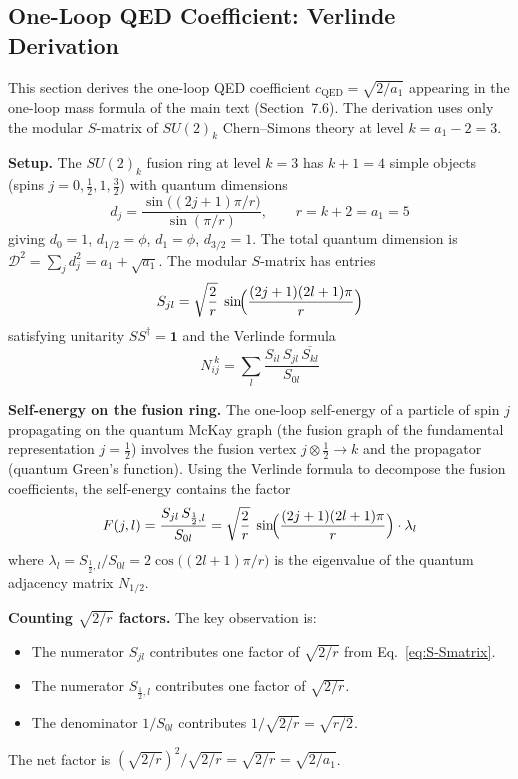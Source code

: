 \documentclass[12pt,a4paper]{article}
\theoremstyle{definition}
\begin{document}
\subsection{One-Loop QED Coefficient: Verlinde Derivation}
\label{sec:S-oneloop}

This section derives the one-loop QED coefficient $c_{\text{QED}} = \sqrt{2/a_1}$ appearing in the one-loop mass formula of the main text (Section~7.6).  The derivation uses only the modular $S$-matrix of $SU(2)_k$ Chern--Simons theory at level $k = a_1 - 2 = 3$.

\textbf{Setup.}  The $SU(2)_k$ fusion ring at level $k = 3$ has $k + 1 = 4$ simple objects (spins $j = 0, \tfrac{1}{2}, 1, \tfrac{3}{2}$) with quantum dimensions
\begin{equation}
d_j = \frac{\sin\bigl((2j+1)\pi/r\bigr)}{\sin(\pi/r)}, \qquad r = k + 2 = a_1 = 5
\end{equation}
giving $d_0 = 1$, $d_{1/2} = \phi$, $d_1 = \phi$, $d_{3/2} = 1$.  The total quantum dimension is $\mathcal{D}^2 = \sum_j d_j^2 = a_1 + \sqrt{a_1}$.  The modular $S$-matrix has entries
\begin{equation}
S_{jl} = \sqrt{\frac{2}{r}}\;\sin\!\Bigl(\frac{(2j+1)(2l+1)\pi}{r}\Bigr)
\label{eq:S-Smatrix}
\end{equation}
satisfying unitarity $SS^\dagger = \mathbf{1}$ and the Verlinde formula
\begin{equation}
N_{ij}^{\;k} = \sum_l \frac{S_{il}\,S_{jl}\,\overline{S_{kl}}}{S_{0l}}
\label{eq:S-verlinde}
\end{equation}

\textbf{Self-energy on the fusion ring.}  The one-loop self-energy of a particle of spin $j$ propagating on the quantum McKay graph (the fusion graph of the fundamental representation $j = \tfrac{1}{2}$) involves the fusion vertex $j \otimes \tfrac{1}{2} \to k$ and the propagator (quantum Green's function).  Using the Verlinde formula to decompose the fusion coefficients, the self-energy contains the factor
\begin{equation}
F(j,l) = \frac{S_{jl}\,S_{\frac{1}{2},l}}{S_{0l}} = \sqrt{\frac{2}{r}}\;\sin\!\Bigl(\frac{(2j+1)(2l+1)\pi}{r}\Bigr) \cdot \lambda_l
\label{eq:S-Fjl}
\end{equation}
where $\lambda_l = S_{\frac{1}{2},l}/S_{0l} = 2\cos\bigl((2l+1)\pi/r\bigr)$ is the eigenvalue of the quantum adjacency matrix $N_{1/2}$.

\textbf{Counting $\sqrt{2/r}$ factors.}  The key observation is:
\begin{itemize}
\item The numerator $S_{jl}$ contributes one factor of $\sqrt{2/r}$ from Eq.~\eqref{eq:S-Smatrix}.
\item The numerator $S_{\frac{1}{2},l}$ contributes one factor of $\sqrt{2/r}$.
\item The denominator $1/S_{0l}$ contributes $1/\sqrt{2/r} = \sqrt{r/2}$.
\end{itemize}
The net factor is $(\sqrt{2/r})^2 / \sqrt{2/r} = \sqrt{2/r} = \sqrt{2/a_1}$.
\end{document}
